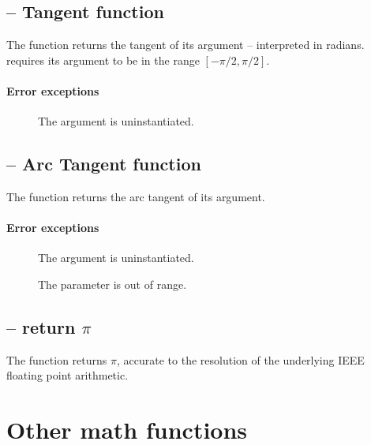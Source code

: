\subsection{ -- Tangent function}
\label{arith:tan}
The  function returns the tangent of its argument -- interpreted in radians.   requires its argument to be in the range $[-\pi/2,\pi/2]$.
        
        
\paragraph{Error exceptions}
\begin{description}
\item[]
The argument is uninstantiated.
\end{description}

\subsection{ -- Arc Tangent function}
\label{arith:atan}
     
The  function returns the arc tangent of its argument.
\paragraph{Error exceptions}
\begin{description}
\item[]
The argument is uninstantiated.
\item[]
The parameter is out of range.
\item[]
\end{description}

\subsection{ -- return \texorpdfstring{$\pi$}{pi}}
\label{arith:pi}

The  function returns $\pi$, accurate to the resolution of the underlying IEEE floating point arithmetic.

\section{Other math functions}
\label{arith:other}


